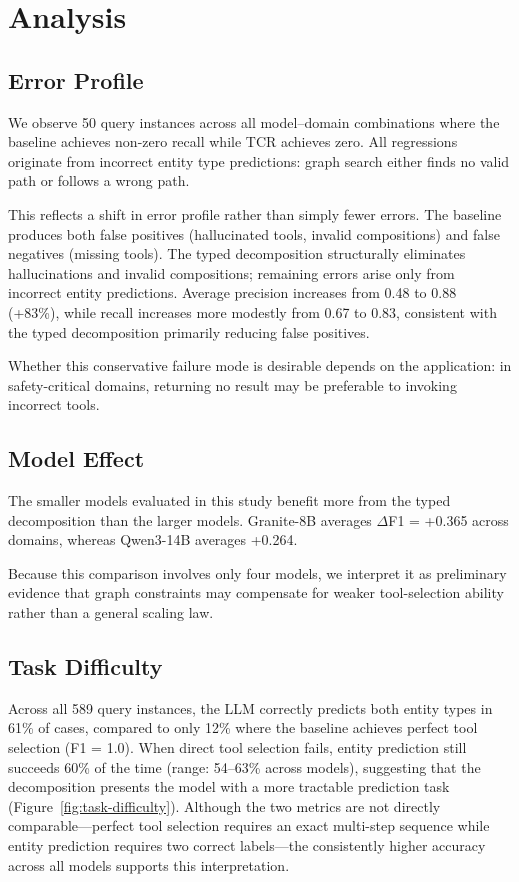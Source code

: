 \section{Analysis}
\label{sec:analysis}

\subsection{Error Profile}
\label{sec:regressions}

We observe 50 query instances across all model--domain combinations where the baseline achieves non-zero recall while TCR achieves zero.
All regressions originate from incorrect entity type predictions: graph search either finds no valid path or follows a wrong path.

This reflects a shift in error profile rather than simply fewer errors.
The baseline produces both false positives (hallucinated tools, invalid compositions) and false negatives (missing tools).
The typed decomposition structurally eliminates hallucinations and invalid compositions; remaining errors arise only from incorrect entity predictions.
Average precision increases from 0.48 to 0.88 (+83\%), while recall increases more modestly from 0.67 to 0.83, consistent with the typed decomposition primarily reducing false positives.

Whether this conservative failure mode is desirable depends on the application: in safety-critical domains, returning no result may be preferable to invoking incorrect tools.

\subsection{Model Effect}
\label{sec:model-effect}

The smaller models evaluated in this study benefit more from the typed decomposition than the larger models.
Granite-8B averages $\Delta$F1 = +0.365 across domains, whereas Qwen3-14B averages +0.264.

Because this comparison involves only four models, we interpret it as preliminary evidence that graph constraints may compensate for weaker tool-selection ability rather than a general scaling law.

\subsection{Task Difficulty}
\label{sec:task-difficulty}

Across all 589 query instances, the LLM correctly predicts both entity types in 61\% of cases, compared to only 12\% where the baseline achieves perfect tool selection (F1 = 1.0).
When direct tool selection fails, entity prediction still succeeds 60\% of the time (range: 54--63\% across models), suggesting that the decomposition presents the model with a more tractable prediction task (Figure~\ref{fig:task-difficulty}).
Although the two metrics are not directly comparable---perfect tool selection requires an exact multi-step sequence while entity prediction requires two correct labels---the consistently higher accuracy across all models supports this interpretation.

